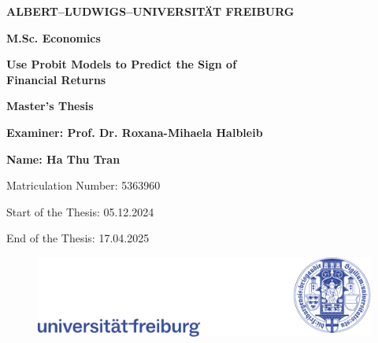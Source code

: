 

\begin{titlepage}
\begin{center}
\vspace{1cm}

\textbf{\Large ALBERT–LUDWIGS–UNIVERSITÄT FREIBURG}

\vspace{0.5cm}
\textbf{\Large M.Sc. Economics}

\vspace{2cm}
\textbf{\Large Use Probit Models to Predict the Sign of \\Financial Returns}

\vspace{1.5cm}
\textbf{Master's Thesis}

\vspace{0.5cm}
\textbf{Examiner: Prof. Dr. Roxana-Mihaela Halbleib}

\vspace{0.5cm}
\textbf{Name: Ha Thu Tran}

\vspace{0.5cm}
Matriculation Number: 5363960

\vspace{0.5cm}
Start of the Thesis: 05.12.2024

\vspace{0.5cm}
End of the Thesis: 17.04.2025

\vspace{2cm}
\end{center}
 \vfill 
    \begin{figure}[b]
        \centering
        \includegraphics[width=\linewidth]{figures/title page/logo.pdf}
    \end{figure}
\end{titlepage}


\restoregeometry